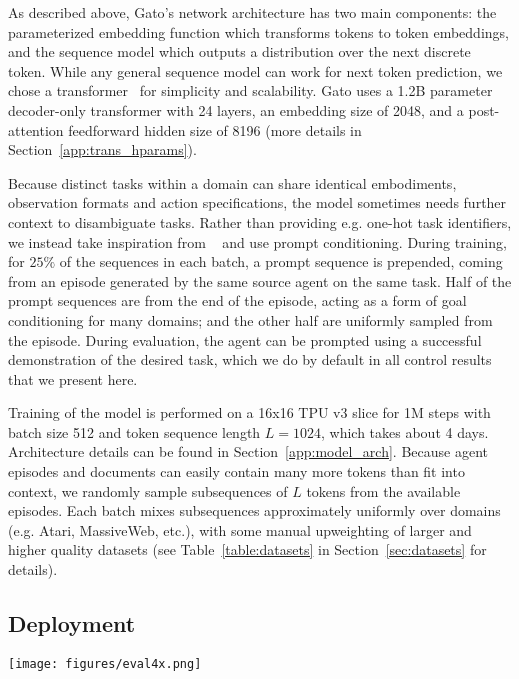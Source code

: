 \documentclass[10pt]{article} \usepackage[accepted]{tmlr}
\newcommand{\model}{{Gato}}
\begin{document}
As described above, \model{}'s network architecture has two main components: the parameterized embedding function which transforms tokens to token embeddings, and the sequence model which outputs a distribution over the next discrete token.
While any general sequence model can work for next token prediction, we chose a transformer~\citep{vaswani2017attention} for simplicity and scalability.
\model{} uses a 1.2B parameter decoder-only transformer with 24 layers, an embedding size of 2048, and a post-attention feedforward hidden size of 8196 (more details in Section~\ref{app:trans_hparams}).

Because distinct tasks within a domain can share identical embodiments, observation formats and action specifications, the model sometimes needs further context to disambiguate tasks.
Rather than providing e.g. one-hot task identifiers, we instead take inspiration from ~\citep{sanh2022multitask,wei2021finetuned,brown2020language} and use prompt conditioning.
During training, for $25\%$ of the sequences in each batch, a prompt sequence is prepended, coming from an episode generated by the same source agent on the same task.
Half of the prompt sequences are from the end of the episode, acting as a form of goal conditioning for many domains; and the other half are uniformly sampled from the episode.
During evaluation, the agent can be prompted using a successful demonstration of the desired task, which we do by default in all control results that we present here.

Training of the model is performed on a 16x16 TPU v3 slice for 1M steps with batch size 512 and token sequence length $L = 1024$, which takes about 4 days.
Architecture details can be found in Section~\ref{app:model_arch}.
Because agent episodes and documents can easily contain many more tokens than fit into context, we randomly sample subsequences of $L$ tokens from the available episodes.
Each batch mixes subsequences approximately uniformly over domains (e.g. Atari, MassiveWeb, etc.), with some manual upweighting of larger and higher quality datasets (see Table~\ref{table:datasets} in Section~\ref{sec:datasets} for details).
\vskip 0.4cm
\subsection{Deployment}
\label{sec:evaluation_protocol}
\vskip 0.2cm
\begin{figure*}[t]
	\centering
	\texttt{[image: figures/eval4x.png]}
	\caption{\textbf{Running \model{} as a control policy.} \model{} consumes a sequence of interleaved tokenized observations, separator tokens, and previously sampled actions to produce the next action in standard autoregressive manner. The new action is applied to the environment -- a game console in this illustration, a new set of observations is obtained, and the process repeats.}
	\label{fig:evaluation}
\end{figure*}
\end{document}
